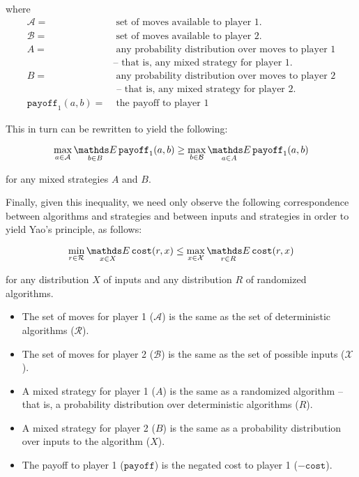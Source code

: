 where \begin{align*}
\mathcal{A} =&\; \text{set of moves available to player 1.}
\\
\mathcal{B} =&\; \text{set of moves available to player 2.}
\\
A =&\; \text{any probability distribution over moves to player 1}
    \\&\text{-- that is, any mixed strategy for player 1.}
\\
B =&\; \text{any probability distribution over moves to player 2}
    \\&\text{ -- that is, any mixed strategy for player 2.}
\\
\texttt{payoff}_1(a, b) =&\; \text{the payoff to player 1}
\end{align*}

This in turn can be rewritten to yield the following:

$$\max_{a \in \mathcal{A}} \Expected_{b \in B} \texttt{payoff}_1(a, b) \geq \max_{b \in \mathcal{B}} \Expected_{a \in A} \texttt{payoff}_1(a, b)$$

for any mixed strategies $A$ and $B$.

Finally, given this inequality, we need only observe the following correspondence between algorithms and strategies and between inputs and strategies in order to yield Yao's principle, as follows:

$$\min_{r \in \mathcal{R}} \Expected_{x \in X} \texttt{cost}(r, x) \leq \max_{x \in \mathcal{X}} \Expected_{r \in R} \texttt{cost}(r, x)$$

for any distribution $X$ of inputs and any distribution $R$ of randomized algorithms.

\begin{itemize}

\item{The set of moves for player 1 ($\mathcal{A}$) is the same as the set of deterministic algorithms ($\mathcal{R}$).}
\item{The set of moves for player 2 ($\mathcal{B}$) is the same as the set of possible inputs ($\mathcal{X}$).}
\item{A mixed strategy for player 1 ($A$) is the same as a randomized algorithm -- that is, a probability distribution over deterministic algorithms ($R$).}
\item{A mixed strategy for player 2 ($B$) is the same as a probability distribution over inputs to the algorithm ($X$).}
\item{The payoff to player 1 ($\texttt{payoff}$) is the negated cost to player 1 ($-\texttt{cost}$).}

\end{itemize}


